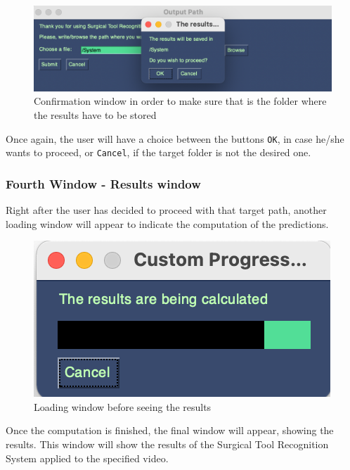 \documentclass{article}
\begin{document}
\begin{figure}[H]
    \centering
    \includegraphics[width = \linewidth]{confirm_window2.png}
    \caption{Confirmation window in order to make sure that is the folder where the results have to be stored}
    \label{fig:confirm2}
\end{figure}
\noindent
Once again, the user will have a choice between the buttons \texttt{OK}, in case he/she wants to proceed, or \texttt{Cancel}, if the target folder is not the desired one.

\subsubsection{Fourth Window - Results window}
Right after the user has decided to proceed with that target path, another loading window will appear to indicate the computation of the predictions.

\begin{figure}[H]
    \centering
    \includegraphics[width = 0.5\linewidth]{Loading_window2.png}
    \caption{Loading window before seeing the results}
    \label{fig:loading2}
\end{figure}
\noindent
Once the computation is finished, the final window will appear, showing the results. This window will show the results of the Surgical Tool Recognition System applied to the specified video. 
\end{document}
